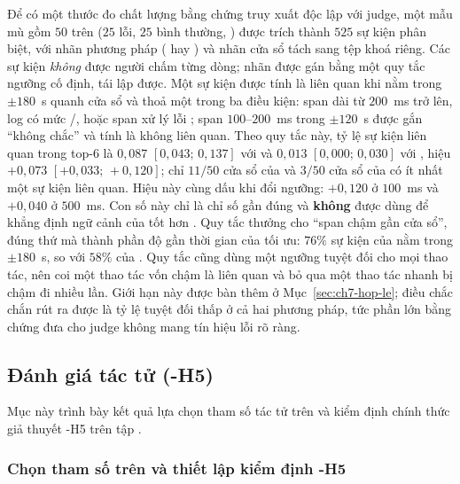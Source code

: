 Để có một thước đo chất lượng bằng chứng truy xuất độc lập với judge, một mẫu mù gồm $50$  trên  ($25$ lỗi, $25$ bình thường, ) được trích thành $525$ sự kiện phân biệt, với nhãn phương pháp ( hay ) và nhãn cửa sổ tách sang tệp khoá riêng. Các sự kiện \emph{không} được người chấm từng dòng; nhãn được gán bằng một quy tắc ngưỡng cố định, tái lập được. Một sự kiện được tính là liên quan khi nằm trong $\pm 180$~s quanh cửa sổ và thoả một trong ba điều kiện: span dài từ $200$~ms trở lên, log có mức /, hoặc span xử lý lỗi ; span $100$--$200$~ms trong $\pm 120$~s được gắn ``không chắc'' và tính là không liên quan. %
Theo quy tắc này, tỷ lệ sự kiện liên quan trong top-6 là $0{,}087$ $[0{,}043;\, 0{,}137]$ với  và $0{,}013$ $[0{,}000;\, 0{,}030]$ với , hiệu $+0{,}073$ $[+0{,}033;\, +0{,}120]$; chỉ $11/50$ cửa sổ của  và $3/50$ cửa sổ của  có ít nhất một sự kiện liên quan. Hiệu này cùng dấu khi đổi ngưỡng: $+0{,}120$ ở $100$~ms và $+0{,}040$ ở $500$~ms. %
Con số này chỉ là chỉ số gần đúng và \textbf{không} được dùng để khẳng định ngữ cảnh của  tốt hơn . Quy tắc thưởng cho ``span chậm gần cửa sổ'', đúng thứ mà thành phần độ gần thời gian của  tối ưu: $76\%$ sự kiện của  nằm trong $\pm 180$~s, so với $58\%$ của . Quy tắc cũng dùng một ngưỡng tuyệt đối cho mọi thao tác, nên coi một thao tác vốn chậm là liên quan và bỏ qua một thao tác nhanh bị chậm đi nhiều lần. Giới hạn này được bàn thêm ở Mục~\ref{sec:ch7-hop-le}; điều chắc chắn rút ra được là tỷ lệ tuyệt đối thấp ở cả hai phương pháp, tức phần lớn bằng chứng đưa cho judge không mang tín hiệu lỗi rõ ràng.

\subsection{Đánh giá tác tử  (\hyp{H5})}
\label{sec:ch5-rca}

Mục này trình bày kết quả lựa chọn tham số tác tử  trên  và kiểm định chính thức giả thuyết \hyp{H5} trên tập .

\subsubsection{Chọn tham số trên  và thiết lập kiểm định \hyp{H5}}
\label{sec:ch5-rca-setup}

